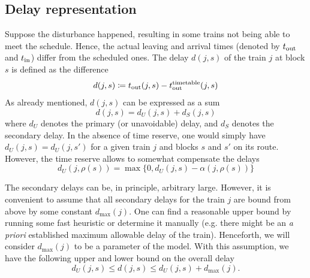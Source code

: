 \subsection{Delay representation}
Suppose the disturbance happened, resulting in some trains not being able to
meet the schedule. Hence, the actual leaving and arrival times (denoted by
$t_\text{out}$ and $t_\text{in}$) differ from the scheduled ones. The delay $d(j, s)$ of the
train $j$ at block $s$ is defined as the difference
\begin{equation}
  \label{eq:djs}
  d(j, s) \coloneqq \tout(j, s) - \ttout(j, s) %
\end{equation}
As already mentioned, $d(j, s)$ can be expressed as a sum
\begin{equation}
  d(j, s) = d_U(j, s) + d_S(j, s)
\end{equation}
where $d_U$ denotes the primary (or unavoidable) delay, and $d_S$ denotes the
secondary delay. In the absence of time reserve, one would simply have $d_U(j,
  s) = d_U(j, s')$ for a given train $j$ and blocks $s$ and $s'$ on its route.
However, the time reserve allows to somewhat compensate the delays
\begin{equation}
  d_U(j, \rho(s)) = \max\{0, d_U(j, s) - \alpha(j, \rho(s))\}
\end{equation}

The secondary delays can be, in principle, arbitrary large. However, it is
convenient to assume that all secondary delays for the train $j$ are bound from
above by some constant $d_{\max}(j)$. One can find a reasonable upper bound by
running some fast heuristic or determine it manually (e.g. there might be an
\emph{a priori} established maximum allowable delay of the train). Henceforth,
we will consider $d_{\max}(j)$ to be a parameter of the model. With this
assumption, we have the following upper and lower bound on the overall delay
\begin{equation}
  d_U(j, s) \le d(j, s) \le d_U(j, s) + d_{\max}(j).
\end{equation}

